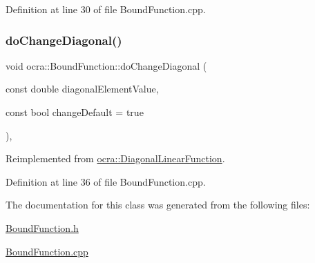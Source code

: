 Definition at line 30 of file Bound\+Function.\+cpp.

\hypertarget{classocra_1_1BoundFunction_ac1a1b78b8b1796543b4c83ae5d8de755}{}\label{classocra_1_1BoundFunction_ac1a1b78b8b1796543b4c83ae5d8de755} 
\subsubsection{\texorpdfstring{do\+Change\+Diagonal()}{doChangeDiagonal()}\hspace{0.1cm}{\footnotesize\ttfamily [2/2]}}
{\footnotesize\ttfamily void ocra\+::\+Bound\+Function\+::do\+Change\+Diagonal (\begin{DoxyParamCaption}\item[{const double}]{diagonal\+Element\+Value,  }\item[{const bool}]{change\+Default = {\ttfamily true} }\end{DoxyParamCaption})\hspace{0.3cm}{\ttfamily [protected]}, {\ttfamily [virtual]}}



Reimplemented from \hyperlink{classocra_1_1DiagonalLinearFunction_a0673bfe405d5637182c4749dd2737e95}{ocra\+::\+Diagonal\+Linear\+Function}.



Definition at line 36 of file Bound\+Function.\+cpp.



The documentation for this class was generated from the following files\+:\begin{DoxyCompactItemize}
\item 
\hyperlink{BoundFunction_8h}{Bound\+Function.\+h}\item 
\hyperlink{BoundFunction_8cpp}{Bound\+Function.\+cpp}\end{DoxyCompactItemize}
